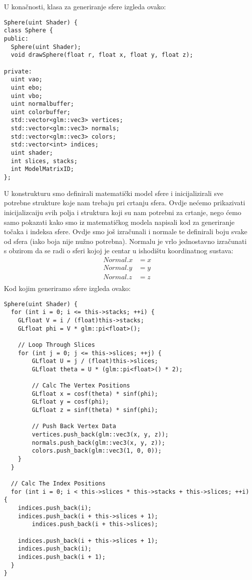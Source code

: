 U konačnosti, klasa za generiranje sfere izgleda ovako:
\begin{lstlisting}[style = myC++, label =  {code:18-1}, caption = {Kod za generiranje sfere}]
Sphere(uint Shader) {
class Sphere {
public:
  Sphere(uint Shader);
  void drawSphere(float r, float x, float y, float z);

private:
  uint vao;
  uint ebo;
  uint vbo;
  uint normalbuffer;
  uint colorbuffer;
  std::vector<glm::vec3> vertices;
  std::vector<glm::vec3> normals;
  std::vector<glm::vec3> colors;
  std::vector<int> indices;
  uint shader;
  int slices, stacks;
  int ModelMatrixID;
};
\end{lstlisting}
U konstrukturu smo definirali matematički model sfere i inicijalizirali sve potrebne strukture koje nam trebaju pri crtanju sfera. Ovdje nećemo prikazivati inicijalizcaiju svih polja i struktura koji su nam potrebni za crtanje, nego ćemo samo pokazati kako smo iz matematičkog modela napisali kod za generiranje točaka i indeksa sfere. Ovdje smo još izračunali i normale te definirali boju svake od sfera (iako boja nije nužno potrebna). Normalu je vrlo jednostavno izračunati s obzirom da se radi o sferi kojoj je centar u ishodištu koordinatnog sustava:
\begin{equation}
	\begin{aligned}
		Normal.x &= x \\
		Normal.y &= y \\
		Normal.z &= z \\
	\end{aligned}
\end{equation}
Kod kojim generiramo sfere izgleda ovako:\newpage
\begin{lstlisting}[style = myC++, label =  {code:19}, caption = {Kod za generiranje točaka i indeksa sfere}]
Sphere(uint Shader) {
  for (int i = 0; i <= this->stacks; ++i) {
	GLfloat V = i / (float)this->stacks;
	GLfloat phi = V * glm::pi<float>();
		
	// Loop Through Slices
	for (int j = 0; j <= this->slices; ++j) {
		GLfloat U = j / (float)this->slices;
		GLfloat theta = U * (glm::pi<float>() * 2);

		// Calc The Vertex Positions
		GLfloat x = cosf(theta) * sinf(phi);
		GLfloat y = cosf(phi);
		GLfloat z = sinf(theta) * sinf(phi);

		// Push Back Vertex Data
		vertices.push_back(glm::vec3(x, y, z));
		normals.push_back(glm::vec3(x, y, z));
		colors.push_back(glm::vec3(1, 0, 0));
	}
  }

  // Calc The Index Positions
  for (int i = 0; i < this->slices * this->stacks + this->slices; ++i) {
	indices.push_back(i);
	indices.push_back(i + this->slices + 1);
		indices.push_back(i + this->slices);

	indices.push_back(i + this->slices + 1);
	indices.push_back(i);
	indices.push_back(i + 1);
  }
}
\end{lstlisting}\newpage
